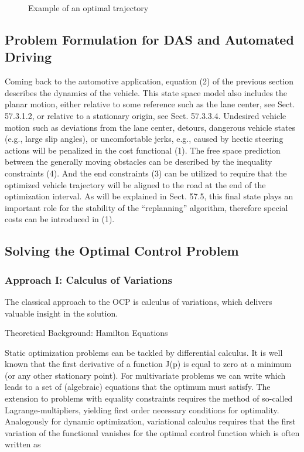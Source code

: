 \begin{figure}[htp!]
\centering
\caption{Example of an optimal trajectory} %
\label{fig:example_of_optimal_trajectory}
\end{figure}

\subsection{Problem Formulation for DAS and Automated Driving}
Coming back to the automotive application, equation (2) of the previous section describes the dynamics of the vehicle. This state space model also includes the planar motion, either relative to some reference such as the lane center, see Sect. 57.3.1.2, or relative to a stationary origin, see Sect. 57.3.3.4. Undesired vehicle motion such as deviations from the lane center, detours, dangerous vehicle states (e.g., large slip angles), or uncomfortable jerks, e.g., caused by hectic steering actions will be penalized in the cost functional (1). The free space prediction between the generally moving obstacles can be described by the inequality constraints (4). And the end constraints (3) can be utilized to require that the optimized vehicle trajectory will be aligned to the road at the end of the optimization interval. As will be explained in Sect. 57.5, this final state plays an important role for the stability of the “replanning” algorithm, therefore special costs
can be introduced in (1). 

\subsection{Solving the Optimal Control Problem}

\subsubsection{Approach I: Calculus of Variations}
The classical approach to the OCP is calculus of variations, which delivers valuable insight in the solution. 

Theoretical Background: Hamilton Equations

Static optimization problems can be tackled by differential calculus. It is well known that the first derivative of a function J(p) is equal to zero at a minimum (or any other stationary point). For multivariate problems we can write 
which leads to a set of (algebraic) equations that the optimum 
must satisfy. The extension to problems with equality constraints requires the method of so-called Lagrange-multipliers, yielding first order necessary conditions for optimality.
Analogously for dynamic optimization, variational calculus requires that the first variation of the functional %
vanishes for the optimal control function %
which is often written as 

